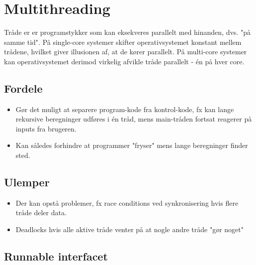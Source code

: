 
\section{Multithreading}


Tråde er er programstykker som kan eksekveres parallelt med hinanden, dvs. "på samme tid". På single-core systemer skifter operativsystemet konstant mellem trådene, hvilket giver illusionen af, at de kører parallelt. På multi-core systemer kan operativsystemet derimod virkelig afvikle tråde parallelt - én på hver core.

\subsection{Fordele}

\begin{itemize}
  \item Gør det muligt at separere program-kode fra kontrol-kode, fx kan lange rekursive beregninger udføres i én tråd, mens main-tråden fortsat reagerer på inputs fra brugeren.
  \item Kan således forhindre at programmer "fryser" mens lange beregninger finder sted.
\end{itemize}

\subsection{Ulemper}

\begin{itemize}
  \item Der kan opstå problemer, fx race conditions ved synkronisering hvis flere tråde deler data.
  \item Deadlocks hvis alle aktive tråde venter på at nogle andre tråde "gør noget"
\end{itemize}

\subsection{Runnable interfacet}

